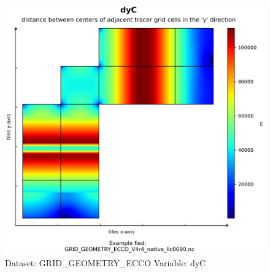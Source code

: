\begin{figure}[H]
\centering
\includegraphics[scale=0.55]{../images/plots/native_plots_coords/Geometry_Parameters_for_the_Lat-Lon-Cap_90_(llc90)_Native_Model_Grid_(Version_4_Release_4)/dyC.png}
\caption{Dataset: GRID\_GEOMETRY\_ECCO Variable: dyC}
\label{tab:table-GRID_GEOMETRY_ECCO_dyC-Plot}
\end{figure}
\pagebreak
